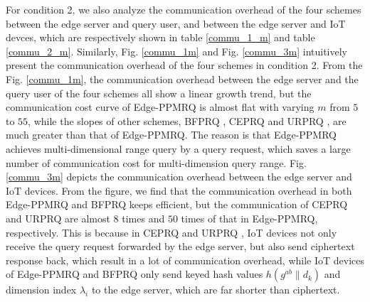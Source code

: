 \documentclass[IEEE JOURNAL OF BIOMEDICAL AND HEALTH INFORMATICS]{IEEEtran}
\begin{document}
  
    For condition 2, we also analyze the communication overhead of the four schemes between the edge server and query user, and between the edge server and IoT devces, which are respectively shown in table \ref{commu_1_m} and table \ref{commu_2_m}. Similarly, Fig. \ref{commu_1m} and Fig. \ref{commu_3m} intuitively present the communication overhead of the four schemes in condition 2. From the Fig. \ref{commu_1m}, the communication overhead between the edge server and the query user of the four schemes all show a linear growth trend, but the communication cost curve of Edge-PPMRQ is almost flat with varying $m$ from $5$ to $55$, while the slopes of other schemes, BFPRQ \cite{mahdikhani2020IoT}, CEPRQ \cite{hasan2020IoT} and URPRQ \cite{mahdikhani2020using}, are much greater than that of Edge-PPMRQ. The reason is that Edge-PPMRQ achieves multi-dimensional range query by a query request, which saves a large number of communication cost for multi-dimension query range. Fig. \ref{commu_3m} depicts the communication overhead between the edge server and IoT devices. From the figure, we find that the communication overhead in both Edge-PPMRQ and BFPRQ \cite{mahdikhani2020IoT} keeps efficient, but the communication of CEPRQ \cite{hasan2020IoT} and URPRQ \cite{mahdikhani2020using} are almost $8$ times and $50$ times of that in Edge-PPMRQ, respectively. This is because in CEPRQ \cite{hasan2020IoT} and URPRQ \cite{mahdikhani2020using}, IoT devices not only receive the query request forwarded by the edge server, but also send ciphertext response back, which result in a lot of communication overhead, while IoT devices of Edge-PPMRQ and BFPRQ \cite{mahdikhani2020IoT} only send keyed hash values $h( g^{ab} \| d_k)$ and dimension index $\lambda_i$ to the edge server, which are far shorter than ciphertext. 
    
    
    
    
    
\end{document}
